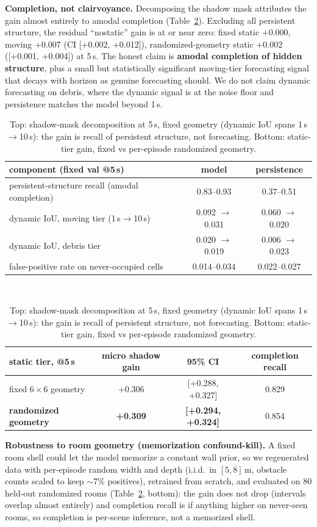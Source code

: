 \documentclass{article}
\begin{document}
\textbf{Completion, not clairvoyance.} Decomposing the shadow mask attributes the gain almost
entirely to amodal completion (Table~\ref{tab:decomp}). Excluding all persistent structure, the
residual ``nostatic'' gain is at or near zero: fixed static +0.000, moving +0.007 (CI
[+0.002, +0.012]), randomized-geometry static +0.002 ([+0.001, +0.004]) at 5\,s. The honest
claim is \textbf{amodal completion of hidden structure}, plus a small but statistically
significant moving-tier forecasting signal that decays with horizon as genuine forecasting
should. We do not claim dynamic forecasting on debris, where the dynamic signal is at the noise
floor and persistence matches the model beyond 1\,s.

\begin{table}[t]
  \centering
  \caption{Top: shadow-mask decomposition at 5\,s, fixed geometry (dynamic IoU spans
  1\,s$\to$10\,s): the gain is recall of persistent structure, not forecasting. Bottom:
  static-tier gain, fixed vs per-episode randomized geometry.}
  \label{tab:decomp}
  \footnotesize
  \begin{tabular}{lcc}
    \toprule
    component (fixed val @5\,s) & model & persistence \\
    \midrule
    persistent-structure recall (amodal completion) & 0.83--0.93 & 0.37--0.51 \\
    dynamic IoU, moving tier (1\,s$\to$10\,s) & 0.092 $\to$ 0.031 & 0.060 $\to$ 0.020 \\
    dynamic IoU, debris tier & 0.020 $\to$ 0.019 & 0.006 $\to$ 0.023 \\
    false-positive rate on never-occupied cells & 0.014--0.034 & 0.022--0.027 \\
    \bottomrule
  \end{tabular}\\[5pt]
  \begin{tabular}{lccc}
    \toprule
    static tier, @5\,s & micro shadow gain & 95\% CI & completion recall \\
    \midrule
    fixed $6\times6$ geometry & +0.306 & [+0.288, +0.327] & 0.829 \\
    \textbf{randomized geometry} & \textbf{+0.309} & \textbf{[+0.294, +0.324]} & 0.854 \\
    \bottomrule
  \end{tabular}
  \vspace{-6pt}
\end{table}

\textbf{Robustness to room geometry (memorization confound-kill).}
A fixed room shell could let the model memorize a constant wall prior, so we regenerated data
with per-episode random width and depth (i.i.d.\ in $[5, 8]$\,m, obstacle counts scaled to keep
${\sim}$7\% positives), retrained from scratch, and evaluated on 80
held-out randomized rooms (Table~\ref{tab:decomp}, bottom): the gain does not drop (intervals overlap almost
entirely) and completion recall is if anything higher on never-seen rooms, so completion is
per-scene inference, not a memorized shell.
\end{document}
